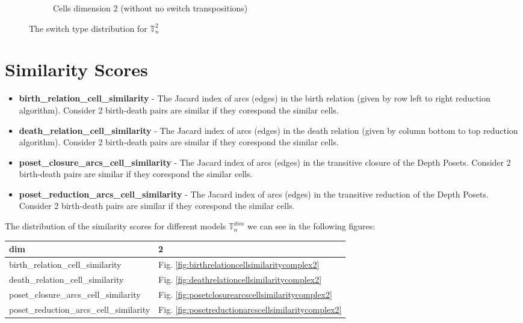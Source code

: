 \documentclass{article}
\begin{document}
\begin{figure}[htbp]
\begin{subfigure}[b]{0.3\textwidth}
    \caption{Cells dimension 2 (without no switch transpositions)}
    \label{fig:complex2cells2onlyswitch}
\end{subfigure}
\caption{The switch type distribution for $\mathbb{T}_n^{2}$}
\label{fig:typesdistribution2}
\end{figure}
\newpage

\section{Similarity Scores}

\begin{itemize}
\item \textbf{birth\_relation\_cell\_similarity} - The Jacard index of arcs (edges) in the birth relation (given by row left to right reduction algorithm).
    Consider 2 birth-death pairs are similar if they corespond the similar cells.
\item \textbf{death\_relation\_cell\_similarity} - The Jacard index of arcs (edges) in the death relation (given by column bottom to top reduction algorithm).
    Consider 2 birth-death pairs are similar if they corespond the similar cells.
\item \textbf{poset\_closure\_arcs\_cell\_similarity} - The Jacard index of arcs (edges) in the transitive closure of the Depth Posets.
    Consider 2 birth-death pairs are similar if they corespond the similar cells.
\item \textbf{poset\_reduction\_arcs\_cell\_similarity} - The Jacard index of arcs (edges) in the transitive reduction of the Depth Posets.
    Consider 2 birth-death pairs are similar if they corespond the similar cells.
\end{itemize}
\par The distribution of the similarity scores for different models $\mathbb{T}^{dim}_n$ we can see in the following figures:
\begin{center}
\begin{tabular}{ll}
\toprule
dim & 2 \\
\midrule
birth\_relation\_cell\_similarity & Fig. \ref{fig:birthrelationcellsimilaritycomplex2} \\
death\_relation\_cell\_similarity & Fig. \ref{fig:deathrelationcellsimilaritycomplex2} \\
poset\_closure\_arcs\_cell\_similarity & Fig. \ref{fig:posetclosurearcscellsimilaritycomplex2} \\
poset\_reduction\_arcs\_cell\_similarity & Fig. \ref{fig:posetreductionarcscellsimilaritycomplex2} \\
\bottomrule
\end{tabular}

\end{center}
\end{document}
